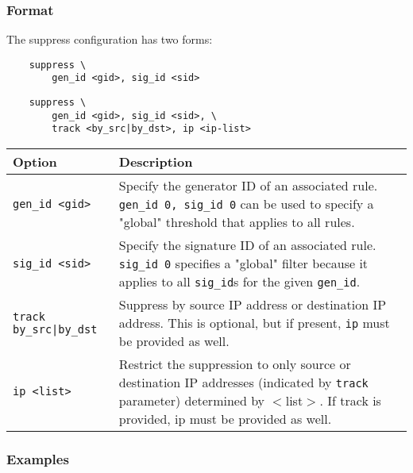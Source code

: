 \documentclass[english]{report}
\begin{document}
\subsubsection{Format}

The suppress configuration has two forms:

\begin{verbatim}
    suppress \
        gen_id <gid>, sig_id <sid>
\end{verbatim}

\begin{verbatim}
    suppress \
        gen_id <gid>, sig_id <sid>, \
        track <by_src|by_dst>, ip <ip-list>
\end{verbatim}

\begin{table}[h]
\begin{center}
\begin{tabular}{| l | p{4.5in} |}

\hline
\textbf{Option} & \textbf{Description}\\
\hline

\hline
\texttt{gen\_id <gid>} &

Specify the generator ID of an associated rule.  \texttt{gen\_id 0, sig\_id 0}
can be used to specify a "global" threshold that applies to all rules.\\

\hline \texttt{sig\_id <sid>} &

Specify the signature ID of an associated rule.  \texttt{sig\_id 0} specifies a
"global" filter because it applies to all \texttt{sig\_id}s for the given
\texttt{gen\_id}.\\

\hline
\texttt{track by\_src|by\_dst} &

Suppress by source IP address or destination IP address.  This is optional, but
if present, \texttt{ip} must be provided as well.\\

\hline
\texttt{ip <list>} &

Restrict the suppression to only source or destination IP addresses (indicated
by \texttt{track} parameter) determined by $<$list$>$.  If track is provided, ip
must be provided as well.\\

\hline
\end{tabular}
\end{center}
\end{table}

\subsubsection{Examples}
\end{document}
